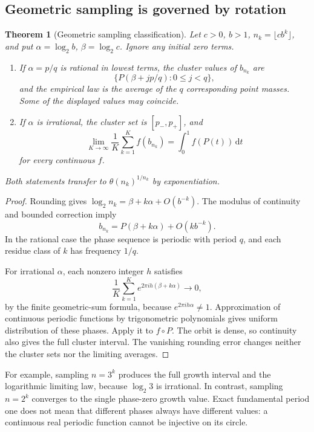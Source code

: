 \documentclass[11pt,a4paper]{article}
\numberwithin{equation}{section}
\newtheorem{theorem}{Theorem}[section]
\theoremstyle{definition}
\theoremstyle{remark}
\newcommand{\dd}{\,\mathrm d}
\theoremstyle{definition}
\theoremstyle{plain}
\begin{document}
\subsection{Geometric sampling is governed by rotation}
\begin{theorem}[Geometric sampling classification]
\label{dsr:thm:geometric}
Let $c>0$, $b>1$, $n_k=\lfloor cb^k\rfloor$, and put
$\alpha=\log_2b$, $\beta=\log_2c$. Ignore any initial zero terms.
\begin{enumerate}[label=\textup{(\roman*)}]
\item If $\alpha=p/q$ is rational in lowest terms, the cluster values of
$b_{n_k}$ are
\begin{equation}
 \{P(\beta+jp/q):0\le j<q\},
\end{equation}
and the empirical law is the average of the $q$ corresponding point masses.
Some of the displayed values may coincide.
\item If $\alpha$ is irrational, the cluster set is $[p_-,p_+]$, and
\begin{equation}
 \lim_{K\to\infty}\frac1K\sum_{k=1}^K f(b_{n_k})
       =\int_0^1f(P(t))\dd t
\end{equation}
for every continuous $f$.
\end{enumerate}
Both statements transfer to $\theta(n_k)^{1/n_k}$ by exponentiation.
\end{theorem}
\begin{proof}
Rounding gives
$\log_2n_k=\beta+k\alpha+O(b^{-k})$. The modulus of continuity and bounded
correction imply
\begin{equation}
 b_{n_k}=P(\beta+k\alpha)+O(kb^{-k}).
\end{equation}
In the rational case the phase sequence is periodic with period $q$, and
each residue class of $k$ has frequency $1/q$.

For irrational $\alpha$, each nonzero integer $h$ satisfies
\[
 \frac1K\sum_{k=1}^K e^{2\pi i h(\beta+k\alpha)}\longrightarrow0,
\]
by the finite geometric-sum formula, because
$e^{2\pi i h\alpha}\ne1$. Approximation of continuous periodic functions by
trigonometric polynomials gives uniform distribution of these phases.
Apply it to $f\circ P$. The orbit is dense, so continuity also gives the
full cluster interval. The vanishing rounding error changes neither the
cluster sets nor the limiting averages.
\end{proof}
For example, sampling $n=3^k$ produces the full growth interval and the
logarithmic limiting law, because $\log_2 3$ is irrational. In contrast,
sampling $n=2^k$ converges to the single phase-zero growth value. Exact
fundamental period one does not mean that different phases always have
different values: a continuous real periodic function cannot be injective
on its circle.
\end{document}
